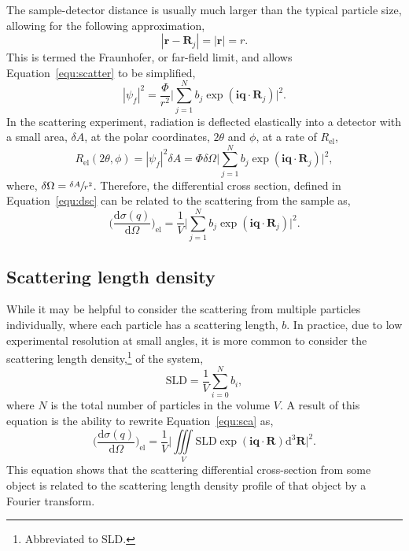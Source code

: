 The sample-detector distance is usually much larger than the typical particle size, allowing for the following approximation,
%
\begin{equation}
    |\mathbf{r} - \mathbf{R}_j| = |\mathbf{r}| = r.
\end{equation}
%
This is termed the Fraunhofer, or far-field limit, and allows Equation~\ref{equ:scatter} to be simplified,
%
\begin{equation}
    |\psi_f|^2 = \frac{\Phi}{r^2}\Bigg|\sum_{j=1}^{N}b_j\exp{(\mathbf{iq}\cdot\mathbf{R}_j)}\Bigg|^2.
\end{equation}
%
In the scattering experiment, radiation is deflected elastically into a detector with a small area, $\delta A$, at the polar coordinates, $2\theta$ and $\phi$, at a rate of $R_{\text{el}}$,
%
\begin{equation}
    R_{\text{el}}(2\theta,\phi) = |\psi_f|^2\delta A = \Phi\delta\Omega\Bigg|\sum_{j=1}^{N}b_j\exp{(\mathbf{iq}\cdot\mathbf{R}_j)}\Bigg|^2,
\end{equation}
%
where, $\delta\Omega = \sfrac{\delta A}{r^2}$.
Therefore, the differential cross section, defined in Equation~\ref{equ:dsc} can be related to the scattering from the sample as,
%
\begin{equation}
    \bigg(\frac{\text{d}\sigma(q)}{\text{d}\Omega}\bigg)_{\text{el}} = \frac{1}{V} \Bigg|\sum_{j=1}^{N}b_j\exp{(\mathbf{iq}\cdot\mathbf{R}_j)}\Bigg|^2.
    \label{equ:sca}
\end{equation}
%

\subsection{Scattering length density}
\label{sec:sld}
While it may be helpful to consider the scattering from multiple particles individually, where each particle has a scattering length, $b$.
In practice, due to low experimental resolution at small angles, it is more common to consider the scattering length density,\footnote{Abbreviated to SLD.} of the system,
%
\begin{equation}
    \text{SLD} = \frac{1}{V}\sum_{i=0}^{N} b_i,
\end{equation}
%
where $N$ is the total number of particles in the volume $V$.
A result of this equation is the ability to rewrite Equation~\ref{equ:sca} as,
%
\begin{equation}
    \bigg(\frac{\text{d}\sigma(q)}{\text{d}\Omega}\bigg)_{\text{el}} = \frac{1}{V} \Bigg|\iiint \limits_V \text{SLD}\exp{(\mathbf{iq}\cdot\mathbf{R})}\text{d}^3\mathbf{R}\Bigg|^2.
    \label{equ:sldsca}
\end{equation}
%
This equation shows that the scattering differential cross-section from some object is related to the scattering length density profile of that object by a Fourier transform.

